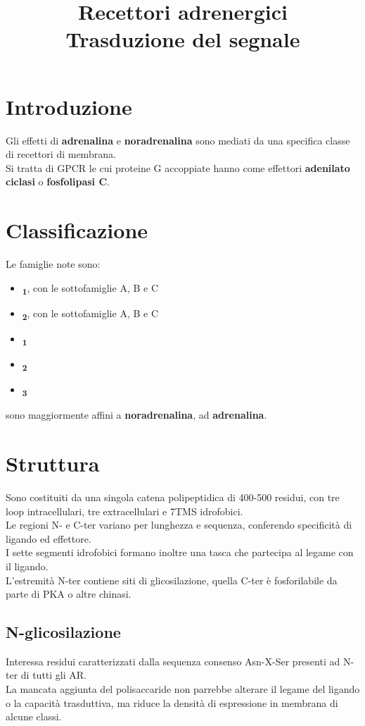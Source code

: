 \documentclass[a4paper, 12pt]{article}
\date{}
\title{%
  Recettori adrenergici \\
  \large Trasduzione del segnale
}
\begin{document}
\maketitle

\section{Introduzione}
Gli effetti di \textbf{adrenalina} e \textbf{noradrenalina} sono mediati da una specifica classe di recettori di membrana.\\
Si tratta di GPCR le cui proteine G accoppiate hanno come effettori \textbf{adenilato ciclasi} o \textbf{fosfolipasi C}.

\section{Classificazione}
Le famiglie note sono:
\begin{itemize}
  \item \textbf{\textalpha\textsubscript{1}}, con le sottofamiglie A, B e C
  \item \textbf{\textalpha\textsubscript{2}}, con le sottofamiglie A, B e C
  \item \textbf{\textbeta\textsubscript{1}}
  \item \textbf{\textbeta\textsubscript{2}}
  \item \textbf{\textbeta\textsubscript{3}}
\end{itemize}
\textalpha sono maggiormente affini a \textbf{noradrenalina}, \textbeta ad \textbf{adrenalina}.

\section{Struttura}
Sono costituiti da una singola catena polipeptidica di 400-500 residui, con tre loop intracellulari, tre extracellulari e 7TMS idrofobici.\\
Le regioni N- e C-ter variano per lunghezza e sequenza, conferendo specificità di ligando ed effettore.\\
I sette segmenti idrofobici formano inoltre una tasca che partecipa al legame con il ligando.\\
L'estremità N-ter contiene siti di glicosilazione, quella C-ter è fosforilabile da parte di PKA o altre chinasi.

\subsection{N-glicosilazione}
Interessa residui caratterizzati dalla sequenza consenso Asn-X-Ser presenti ad N-ter di tutti gli AR.\\
La mancata aggiunta del polisaccaride non parrebbe alterare il legame del ligando o la capacità trasduttiva, ma riduce la densità di espressione in membrana di alcune classi.
\end{document}
